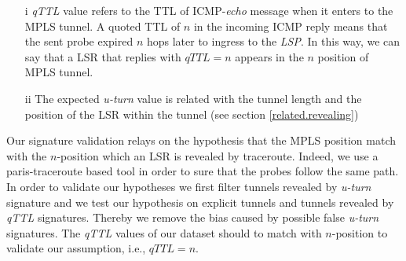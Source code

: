 \begin{itemize}
  \item[i] \textit{qTTL} value refers to the TTL of ICMP-\textit{echo}
  message when it enters to the MPLS  tunnel. A quoted TTL of $n$ in
  the incoming ICMP reply means that the sent probe
  expired $n$ hops later to ingress to the \textit{LSP}. In this way, we can say
  that a LSR that replies with $\textit{qTTL}=n$ appears  in the $n$ position of
  MPLS tunnel.
  \item[ii] The expected \textit{u-turn} value is related with the tunnel length and the position of the LSR within the tunnel (see section \ref{related.revealing})
\end{itemize}



Our signature validation relays on the hypothesis that the MPLS position match
with the $n$-position  which an LSR is revealed by traceroute. Indeed,
we use a paris-traceroute \cite{BRICE06}  based tool in order to sure that the probes follow the
same path. In order to validate our hypotheses we first filter  tunnels revealed by \textit{u-turn} signature and we test our hypothesis on explicit tunnels and tunnels revealed by \textit{qTTL} signatures. Thereby we remove the bias caused by possible false
\textit{u-turn} signatures. The \textit{qTTL} values of our dataset  should to match with
$n$-position to validate our assumption, i.e., $\textit{qTTL}=n$.

